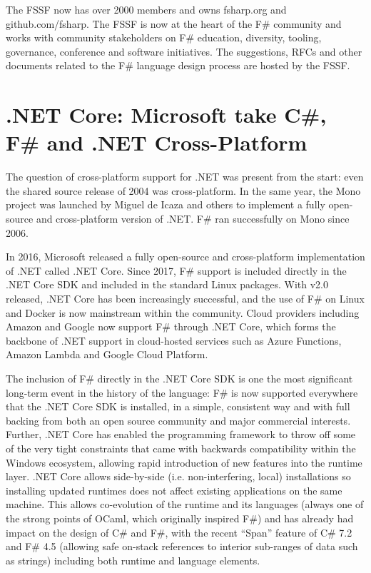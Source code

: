 \documentclass[acmsmall,review]{acmart}\settopmatter{printfolios=true,printccs=false,printacmref=false}
\begin{document}
The FSSF now has over 2000 members and owns fsharp.org and github.com/fsharp. The FSSF is now at the heart of the F\# community and works with community stakeholders on F\# education, diversity, tooling, governance, conference and software initiatives.  The suggestions, RFCs and other documents related to the F\# language design process are hosted by the FSSF. 

\section*{.NET Core: Microsoft take C\#, F\# and .NET Cross-Platform}

The question of cross-platform support for .NET was present from the start: even the shared source release of 2004 was cross-platform.  In the same year, the Mono project was launched by Miguel de Icaza and others to implement a fully open-source and cross-platform version of .NET. F\# ran successfully on Mono since 2006.  

In 2016, Microsoft released a fully open-source and cross-platform implementation of .NET called .NET Core.  Since 2017, F\# support is included directly in the .NET Core SDK and included in the standard Linux packages. With v2.0 released, .NET Core has been increasingly successful, and the use of F\# on Linux and Docker is now mainstream within the community.  Cloud providers including Amazon and Google now support F\# through .NET Core, which forms the backbone of .NET support in cloud-hosted services such as Azure Functions, Amazon Lambda and Google Cloud Platform.

The inclusion of F\# directly in the .NET Core SDK is one the most significant long-term event in the history of the language: F\# is now supported everywhere that the .NET Core SDK is installed, in a simple, consistent way and with full backing from both an open source community and major commercial interests. Further, .NET Core has enabled the programming framework to throw off some of the very tight constraints that came with backwards compatibility within the Windows ecosystem, allowing rapid introduction of new features into the runtime layer.  .NET Core allows side-by-side (i.e. non-interfering, local) installations so installing updated runtimes does not affect existing applications on the same machine. This allows co-evolution of the runtime and its languages (always one of the strong points of OCaml, which originally inspired F\#) and has already had impact on the design of C\# and F\#, with the recent “Span” feature of C\# 7.2 and F\# 4.5 (allowing safe on-stack references to interior sub-ranges of data such as strings) including both runtime and language elements.
\end{document}
